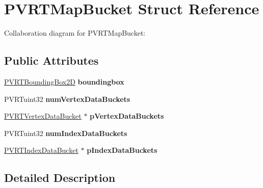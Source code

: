 \hypertarget{struct_p_v_r_t_map_bucket}{\section{P\+V\+R\+T\+Map\+Bucket Struct Reference}
\label{struct_p_v_r_t_map_bucket}
}


Collaboration diagram for P\+V\+R\+T\+Map\+Bucket\+:
\subsection*{Public Attributes}
\begin{DoxyCompactItemize}
\item 
\hypertarget{struct_p_v_r_t_map_bucket_a24e95f1ef528f6c3d0da119b06f38c81}{\hyperlink{struct_p_v_r_t_bounding_box2_d}{P\+V\+R\+T\+Bounding\+Box2\+D} {\bfseries boundingbox}}\label{struct_p_v_r_t_map_bucket_a24e95f1ef528f6c3d0da119b06f38c81}

\item 
\hypertarget{struct_p_v_r_t_map_bucket_a4a3b1a9916a1fc81189e036e56823fbc}{P\+V\+R\+Tuint32 {\bfseries num\+Vertex\+Data\+Buckets}}\label{struct_p_v_r_t_map_bucket_a4a3b1a9916a1fc81189e036e56823fbc}

\item 
\hypertarget{struct_p_v_r_t_map_bucket_a995c91566a1f8de199c4bfb8bb7b847c}{\hyperlink{struct_p_v_r_t_vertex_data_bucket}{P\+V\+R\+T\+Vertex\+Data\+Bucket} $\ast$ {\bfseries p\+Vertex\+Data\+Buckets}}\label{struct_p_v_r_t_map_bucket_a995c91566a1f8de199c4bfb8bb7b847c}

\item 
\hypertarget{struct_p_v_r_t_map_bucket_afa42d626b554efccc95a4c66d79d47ac}{P\+V\+R\+Tuint32 {\bfseries num\+Index\+Data\+Buckets}}\label{struct_p_v_r_t_map_bucket_afa42d626b554efccc95a4c66d79d47ac}

\item 
\hypertarget{struct_p_v_r_t_map_bucket_ac9347e71d1f1888444f320835dc4adf7}{\hyperlink{struct_p_v_r_t_index_data_bucket}{P\+V\+R\+T\+Index\+Data\+Bucket} $\ast$ {\bfseries p\+Index\+Data\+Buckets}}\label{struct_p_v_r_t_map_bucket_ac9347e71d1f1888444f320835dc4adf7}

\end{DoxyCompactItemize}


\subsection{Detailed Description}


